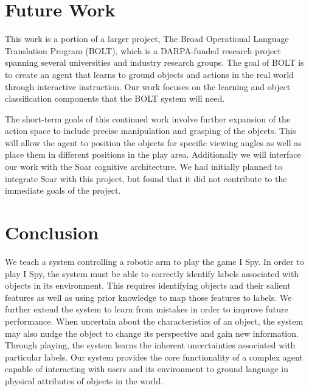 \documentclass[11pt]{article}
\newcommand{\xxx}[1]{{\bf \color{red} #1}}
\begin{document}
\section{Future Work}
\label{sec:future-work}
This work is a portion of a larger project, The Broad Operational Language
Translation Program (BOLT), which is a DARPA-funded research project spanning several
universities and industry research groups. The goal of BOLT is to create an
agent that learns to ground objects and actions in the real world through
interactive instruction. Our work focuses on the learning and object
classification components that the BOLT system will need.

The short-term goals of this continued work involve further expansion of the
action space to include precise manipulation and grasping of the objects. This
will allow the agent to position the objects for specific viewing angles as
well as place them in different positions in the play area. Additionally we will
interface our work with the Soar cognitive architecture. We had initially planned to
integrate Soar with this project, but found that it did not contribute
to the immediate goals of the project.

\section{Conclusion}
We teach a system controlling a robotic arm to play the game I Spy.
In order to play I Spy, the system must be able to correctly identify labels
associated with objects in its environment. This requires identifying objects
and their salient features as well as using prior knowledge to map those features
to labels. We further extend the system to learn from mistakes in order to
improve future performance. When uncertain about the characteristics of an
object, the system may also nudge the object to change its perspective and
gain new information. Through playing, the system learns the inherent
uncertainties associated with particular labels. Our system provides the core
functionality of a complex agent capable of interacting with users and its
environment to ground language in physical attributes of objects in the world.



\end{document}
